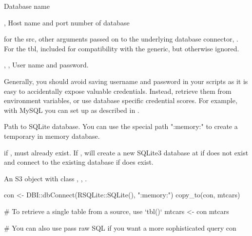 \documentclass[a4paper]{book}
\begin{document}
%
\begin{Arguments}
\begin{ldescription}
\item[\code{dbname}] Database name

\item[\code{host}, \code{port}] Host name and port number of database

\item[\code{...}] for the src, other arguments passed on to the underlying
database connector, . For the tbl, included for
compatibility with the generic, but otherwise ignored.

\item[\code{user}, \code{username}, \code{password}] User name and password.

Generally, you should avoid saving username and password in your
scripts as it is easy to accidentally expose valuable credentials.
Instead, retrieve them from environment variables, or use database
specific credential scores. For example, with MySQL you can set up 
as described in .

\item[\code{path}] Path to SQLite database. You can use the special path
":memory:" to create a temporary in memory database.

\item[\code{create}] if ,  must already exist. If
, will create a new SQLite3 database at  if
 does not exist and connect to the existing database if
 does exist.
\end{ldescription}
\end{Arguments}
%
\begin{Value}
An S3 object with class , , .
\end{Value}
%
\begin{Examples}
\begin{ExampleCode}

con <- DBI::dbConnect(RSQLite::SQLite(), ":memory:")
copy_to(con, mtcars)

# To retrieve a single table from a source, use `tbl()`
mtcars <- con %
mtcars

# You can also use pass raw SQL if you want a more sophisticated query
con %

\end{ExampleCode}
\end{Examples}
\end{document}
